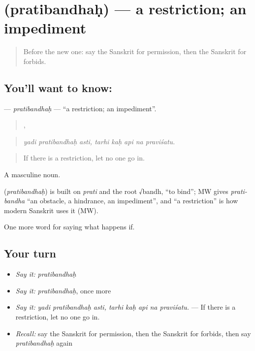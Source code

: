 \section[\texorpdfstring{\sk{प्रतिबन्धः} (pratibandhaḥ)}{प्रतिबन्धः (pratibandhaḥ)}]{ (pratibandhaḥ) — a restriction; an impediment}

\label{lesson:SA-C373-pratibandhah}



\begin{quote}
Before the new one: say the Sanskrit for permission, then the Sanskrit for forbids.
\end{quote}

\subsection*{You'll want to know: }
\textbf{} — \emph{pratibandhaḥ} — \textquotedblleft{}a restriction; an impediment\textquotedblright{}.

\begin{quote}
  ,     
\end{quote}

\begin{quote}
\emph{yadi pratibandhaḥ asti, tarhi kaḥ api na praviśatu.}
\end{quote}

\begin{quote}
If there is a restriction, let no one go in.
\end{quote}

A masculine noun.

\begin{cousinweb}
\textbf{} (\emph{pratibandhaḥ}) is built on \emph{prati} and the root √bandh, \textquotedblleft{}to bind\textquotedblright{}; MW gives \emph{prati-bandha} \textquotedblleft{}an obstacle, a hindrance, an impediment\textquotedblright{}, and \textquotedblleft{}a restriction\textquotedblright{} is how modern Sanskrit uses it (MW).
\end{cousinweb}

\begin{grammarlens}[title={What you've built}]
One more word for saying what happens if.
\end{grammarlens}

\subsection*{Your turn}
\begin{itemize}
\raggedright
  \item \emph{Say it:} \emph{pratibandhaḥ}
  \item \emph{Say it:} \emph{pratibandhaḥ}, once more
  \item \emph{Say it:} \emph{yadi pratibandhaḥ asti, tarhi kaḥ api na praviśatu.} — If there is a restriction, let no one go in.
  \item \emph{Recall:} say the Sanskrit for permission, then the Sanskrit for forbids, then say \emph{pratibandhaḥ} again
\end{itemize}

